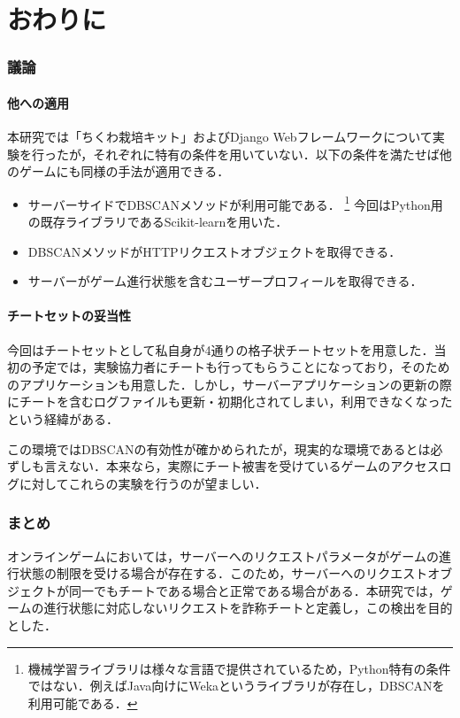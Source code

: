\part{おわりに}
\section{議論}
\subsection{他への適用}
本研究では「ちくわ栽培キット」およびDjango Webフレームワークについて実験を行ったが，それぞれに特有の条件を用いていない．以下の条件を満たせば他のゲームにも同様の手法が適用できる．

\begin{itemize}
\item
サーバーサイドでDBSCANメソッドが利用可能である．
\footnote{機械学習ライブラリは様々な言語で提供されているため，Python特有の条件ではない．例えばJava向けにWeka\cite{weka}というライブラリが存在し，DBSCANを利用可能である．}
今回はPython用の既存ライブラリであるScikit-learn\cite{sklearn}を用いた．
\item
DBSCANメソッドがHTTPリクエストオブジェクトを取得できる．
\item
サーバーがゲーム進行状態を含むユーザープロフィールを取得できる．
\end{itemize}

\subsection{チートセットの妥当性}
今回はチートセットとして私自身が4通りの格子状チートセットを用意した．当初の予定では，実験協力者にチートも行ってもらうことになっており，そのためのアプリケーションも用意した．しかし，サーバーアプリケーションの更新の際にチートを含むログファイルも更新・初期化されてしまい，利用できなくなったという経緯がある．

この環境ではDBSCANの有効性が確かめられたが，現実的な環境であるとは必ずしも言えない．本来なら，実際にチート被害を受けているゲームのアクセスログに対してこれらの実験を行うのが望ましい．

\section{まとめ}
オンラインゲームにおいては，サーバーへのリクエストパラメータがゲームの進行状態の制限を受ける場合が存在する．このため，サーバーへのリクエストオブジェクトが同一でもチートである場合と正常である場合がある．本研究では，ゲームの進行状態に対応しないリクエストを詐称チートと定義し，この検出を目的とした．

